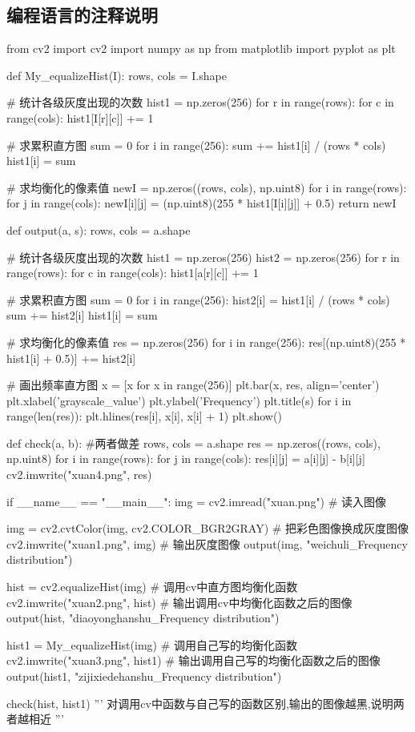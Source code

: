 \documentclass{article}
\begin{document}
\subsection{编程语言的注释说明}
\begin{python}
from cv2 import cv2
import numpy as np
from matplotlib import pyplot as plt


def My_equalizeHist(I):
    rows, cols = I.shape

    # 统计各级灰度出现的次数
    hist1 = np.zeros(256)
    for r in range(rows):
        for c in range(cols):
            hist1[I[r][c]] += 1

    # 求累积直方图
    sum = 0
    for i in range(256):
        sum += hist1[i] / (rows * cols)
        hist1[i] = sum

    # 求均衡化的像素值
    newI = np.zeros((rows, cols), np.uint8)
    for i in range(rows):
        for j in range(cols):
            newI[i][j] = (np.uint8)(255 * hist1[I[i][j]] + 0.5)
    return newI


def output(a, s):
    rows, cols = a.shape

    # 统计各级灰度出现的次数
    hist1 = np.zeros(256)
    hist2 = np.zeros(256)
    for r in range(rows):
        for c in range(cols):
            hist1[a[r][c]] += 1

    # 求累积直方图
    sum = 0
    for i in range(256):
        hist2[i] = hist1[i] / (rows * cols)
        sum += hist2[i]
        hist1[i] = sum
        
    # 求均衡化的像素值
    res = np.zeros(256)
    for i in range(256):
        res[(np.uint8)(255 * hist1[i] + 0.5)] += hist2[i]
        
    # 画出频率直方图
    x = [x for x in range(256)]
    plt.bar(x, res, align='center')
    plt.xlabel('grayscale_value')
    plt.ylabel('Frequency')
    plt.title(s)
    for i in range(len(res)):
        plt.hlines(res[i], x[i], x[i] + 1)
    plt.show()


def check(a, b):
    #两者做差
    rows, cols = a.shape
    res = np.zeros((rows, cols), np.uint8)
    for i in range(rows):
        for j in range(cols):
            res[i][j] = a[i][j] - b[i][j]
    cv2.imwrite("xuan4.png", res)


if __name__ == "__main__":
    img = cv2.imread("xuan.png")  # 读入图像

    img = cv2.cvtColor(img, cv2.COLOR_BGR2GRAY)  # 把彩色图像换成灰度图像
    cv2.imwrite("xuan1.png", img)  # 输出灰度图像
    output(img, "weichuli_Frequency distribution")

    hist = cv2.equalizeHist(img)  # 调用cv中直方图均衡化函数
    cv2.imwrite("xuan2.png", hist)  # 输出调用cv中均衡化函数之后的图像
    output(hist, "diaoyonghanshu_Frequency distribution")

    hist1 = My_equalizeHist(img)  # 调用自己写的均衡化函数
    cv2.imwrite("xuan3.png", hist1)  # 输出调用自己写的均衡化函数之后的图像
    output(hist1, "zijixiedehanshu_Frequency distribution")

    check(hist, hist1)
    '''
    对调用cv中函数与自己写的函数区别,输出的图像越黑,说明两者越相近
    '''


\end{python}
\end{document}
